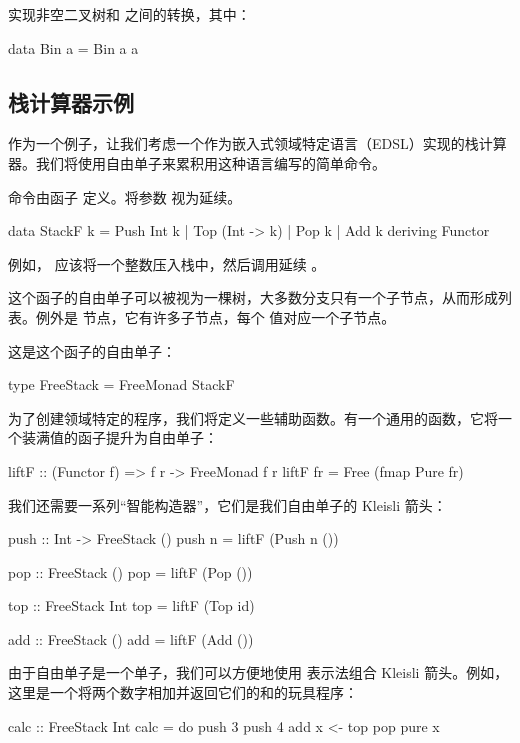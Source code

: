 \documentclass[DaoFP]{subfiles}
\begin{document}
\begin{exercise}
实现非空二叉树和  之间的转换，其中：
\begin{haskell}
data Bin a = Bin a a
\end{haskell}
\end{exercise}

\subsection{栈计算器示例}

作为一个例子，让我们考虑一个作为嵌入式领域特定语言（EDSL）实现的栈计算器。我们将使用自由单子来累积用这种语言编写的简单命令。

命令由函子  定义。将参数  视为延续。
\begin{haskell}
data StackF k  = Push Int k
               | Top (Int -> k)
               | Pop k            
               | Add k
               deriving Functor
\end{haskell}
例如， 应该将一个整数压入栈中，然后调用延续 。

这个函子的自由单子可以被视为一棵树，大多数分支只有一个子节点，从而形成列表。例外是  节点，它有许多子节点，每个  值对应一个子节点。

这是这个函子的自由单子：
\begin{haskell}
type FreeStack = FreeMonad StackF
\end{haskell}

为了创建领域特定的程序，我们将定义一些辅助函数。有一个通用的函数，它将一个装满值的函子提升为自由单子：
\begin{haskell} 
liftF :: (Functor f) => f r -> FreeMonad f r
liftF fr = Free (fmap Pure fr)
\end{haskell}
我们还需要一系列“智能构造器”，它们是我们自由单子的 Kleisli 箭头：
\begin{haskell}
push :: Int -> FreeStack ()
push n = liftF (Push n ())

pop :: FreeStack ()
pop = liftF (Pop ())

top :: FreeStack Int
top = liftF (Top id)

add :: FreeStack ()
add = liftF (Add ())
\end{haskell}

由于自由单子是一个单子，我们可以方便地使用  表示法组合 Kleisli 箭头。例如，这里是一个将两个数字相加并返回它们的和的玩具程序：
\begin{haskell}
calc :: FreeStack Int
calc = do
  push 3
  push 4
  add
  x <- top
  pop
  pure x
\end{haskell}
\end{document}
